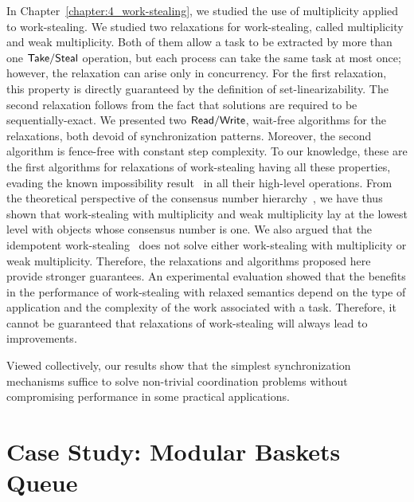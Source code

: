 In Chapter~\ref{chapter:4_work-stealing}, we studied the use of multiplicity applied to work-stealing. We studied two relaxations for work-stealing, called multiplicity and weak multiplicity. Both of them allow a task to be extracted by more than one ${\sf Take}/{\sf Steal}$ operation, but each process can take the same task at most once; however, the relaxation can arise only in concurrency. For the first relaxation, this property is directly guaranteed by the definition of set-linearizability. The second relaxation follows from the fact that solutions are required to be sequentially-exact. We presented two ${\sf Read}/{\sf Write}$, wait-free algorithms for the relaxations, both devoid of \RAW synchronization patterns.
Moreover, the second algorithm is fence-free with constant step complexity. To our knowledge, these are the first algorithms for relaxations of work-stealing having all these properties, evading the known impossibility result~\cite{DBLP_conf_popl_AttiyaGHKMV11} in all their high-level operations. From the theoretical perspective of the consensus number hierarchy~\cite{DBLP_journals_toplas_Herlihy91}, we have thus shown that work-stealing with multiplicity and weak multiplicity lay at the lowest level with objects whose consensus number is one. We also argued that the idempotent work-stealing~\cite{maged.vechev.2009} does not solve either work-stealing with multiplicity or weak multiplicity. Therefore, the relaxations and algorithms proposed here provide stronger guarantees. An experimental evaluation showed that the benefits in the performance of work-stealing with relaxed semantics depend on the type of application and the complexity of the work associated with a task. Therefore, it cannot be guaranteed that relaxations of work-stealing will always lead to improvements.

Viewed collectively, our results show that the simplest synchronization mechanisms suffice to solve non-trivial coordination problems without compromising performance in some practical applications.

\section{Case Study: Modular Baskets Queue}

